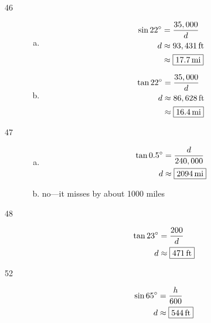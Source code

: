 \documentclass{exam}
\newcommand{\dg}{\ensuremath{^\circ}}
\begin{document}
\begin{description}
      \item[46]
        \begin{enumerate}[(a)]
          \item 
            \begin{align*}
              \sin 22 \dg & = \frac{35,000}{d} \\
              d           & \approx \unit[93,431]{ft} \\
                          & \approx \boxed{ \unit[17.7]{mi} } \\
            \end{align*}

          \item 
            \begin{align*}
              \tan 22 \dg & = \frac{35,000}{d} \\
              d           & \approx \unit[86,628]{ft} \\
                          & \approx \boxed{ \unit[16.4]{mi} } \\
            \end{align*}

        \end{enumerate}

      \item[47]
        \begin{enumerate}[(a)]
          \item 
            \begin{align*}
              \tan 0.5 \dg & = \frac{d}{240,000} \\
              d           & \approx \boxed{ \unit[2094]{mi} } \\
            \end{align*}

          \item 
            no---it misses by about 1000 miles
        \end{enumerate}

      \item[48]
        \begin{align*}
          \tan 23 \dg & = \frac{200}{d} \\
          d           & \approx \boxed{ \unit[471]{ft} } \\
        \end{align*}

      \item[52]
        \begin{align*}
          \sin 65 \dg & = \frac{h}{600} \\
          d           & \approx \boxed{ \unit[544]{ft} } \\
        \end{align*}


\end{description}
\end{document}
